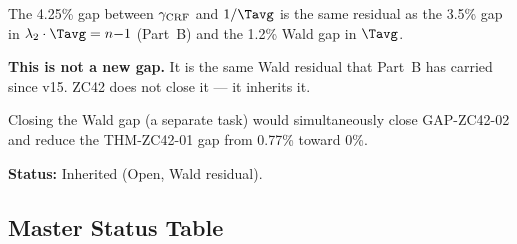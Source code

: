 \documentclass[12pt, a4paper]{article}
\begin{document}
\begin{openqbox}[title={GAP-ZC42-02: Residual 4.25\% at
  $\gamma$ (= Wald Residual, Inherited)}]
The 4.25\% gap between $\gamma_{\rm CRF}$ and $1/\Tavg$
is the same residual as the 3.5\% gap in
$\lambda_2\cdot\Tavg = n{-}1$ (Part~B) and the 1.2\% Wald
gap in $\Tavg$.

\textbf{This is not a new gap.} It is the same Wald
residual that Part~B has carried since v15.
ZC42 does not close it --- it inherits it.

Closing the Wald gap (a separate task) would simultaneously
close GAP-ZC42-02 and reduce the THM-ZC42-01 gap from
0.77\% toward 0\%.

\textbf{Status:} Inherited (Open, Wald residual).
\end{openqbox}

\subsection{Master Status Table}

\end{document}
